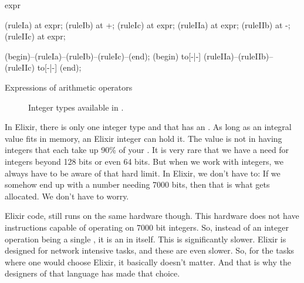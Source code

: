 \begin{syntaxfloat}
  \begin{syntax}{expr}
    
    \node[nonterminal] (ruleIa)  at  {expr};
    \node[terminal]    (ruleIb)  at  {+};
    \node[nonterminal] (ruleIc)  at  {expr};
    \node[nonterminal] (ruleIIa) at  {expr};
    \node[terminal]    (ruleIIb) at  {-};
    \node[nonterminal] (ruleIIc) at  {expr};
    
    \draw[path] (begin)--(ruleIa)--(ruleIb)--(ruleIc)--(end);
    \draw[path] (begin) to[-|-] (ruleIIa)--(ruleIIb)--(ruleIIc) to[-|-] (end);
  \end{syntax}
  \caption{Expressions of arithmetic operators}
\end{syntaxfloat}


\begin{figure}[tbp]
  
  \caption{Integer types available in \csharp.}
  \label{fig:prim:int:csharp:types}
\end{figure}



In Elixir, there is only one integer type and that has an . As long as an integral value fits in memory, an Elixir integer can hold it. The value is not in having integers that each take up 90\% of your . It is very rare that we have a need for integers beyond 128 bits or even 64 bits. But when we work with  integers, we always have to be aware of that hard limit. In Elixir, we don't have to: If we somehow end up with a number needing 7000 bits, then that is what gets allocated. We don't have to worry.

Elixir code, still runs on the same hardware though. This hardware does not have instructions capable of operating on 7000 bit integers. So, instead of an integer operation being a single , it is an  in itself. This is significantly slower. Elixir is designed for network intensive tasks, and these are even slower. So, for the tasks where one would choose Elixir, it basically doesn't matter. And that is why the designers of that language has made that choice.

